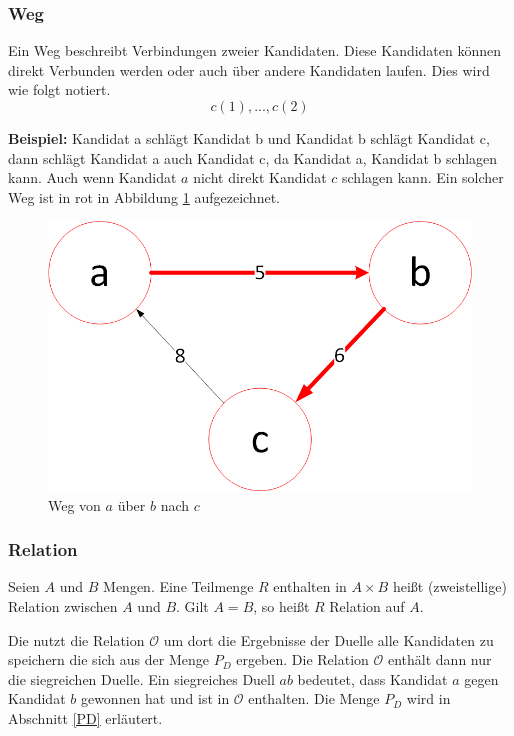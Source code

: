 \subsubsection{Weg}
\label{weg}
Ein Weg beschreibt Verbindungen zweier Kandidaten. Diese Kandidaten können direkt Verbunden werden oder auch über andere Kandidaten laufen. Dies wird wie folgt notiert.
\[
c(1),...,c(2)
\]

\textbf{Beispiel:} Kandidat a schlägt Kandidat b und Kandidat b schlägt Kandidat c, dann schlägt Kandidat a auch Kandidat c, da Kandidat a, Kandidat b schlagen kann. Auch wenn Kandidat $a$ nicht direkt Kandidat $c$ schlagen kann. Ein solcher Weg ist in rot in Abbildung \ref{fig:weg} aufgezeichnet. 

\begin{figure}[!h]
\centering
\includegraphics[scale=0.5]{Bilder/Weg.png}
\caption{Weg von $a$ über $b$ nach $c$}
\label{fig:weg}
\end{figure}

\subsubsection{Relation}
\label{relation}
\glqq Seien $A$ und $B$ Mengen. Eine Teilmenge $R$ enthalten in $A \times B$ heißt (zweistellige) Relation zwischen $A$ und $B$. Gilt $A = B$, so heißt $R$ Relation auf $A$.\grqq \citep{Lang2018}

Die \schulze nutzt die Relation $\mathcal{O}$ um dort die Ergebnisse der Duelle alle Kandidaten zu speichern die sich aus der Menge $P_{D}$ ergeben. Die  Relation $\mathcal{O}$ enthält dann nur die siegreichen Duelle. Ein siegreiches Duell $ab$ bedeutet, dass Kandidat $a$ gegen Kandidat $b$ gewonnen hat und ist in $\mathcal{O}$ enthalten. Die Menge $P_{D}$ wird in Abschnitt \ref{PD} erläutert.


